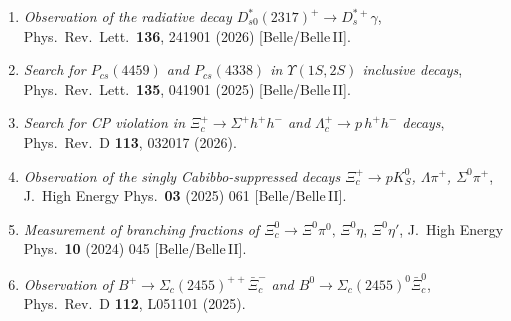 \documentclass[a4paper,11pt,fontset=none]{ctexart}
\begin{document}
{\smallskip
\noindent{}
\begin{enumerate}\setlength{\itemsep}{1.5pt}
  \item \textit{Observation of the radiative decay $D_{s0}^{*}(2317)^{+}\!\to D_{s}^{*+}\gamma$}, Phys.\ Rev.\ Lett.\ \textbf{136}, 241901 (2026) [Belle/Belle\,II].
  \item \textit{Search for $P_{cs}(4459)$ and $P_{cs}(4338)$ in $\Upsilon(1S,2S)$ inclusive decays}, Phys.\ Rev.\ Lett.\ \textbf{135}, 041901 (2025) [Belle/Belle\,II].
  \item \textit{Search for CP violation in $\Xi_{c}^{+}\!\to\Sigma^{+}h^{+}h^{-}$ and $\Lambda_{c}^{+}\!\to p\,h^{+}h^{-}$ decays}, Phys.\ Rev.\ D \textbf{113}, 032017 (2026)\;[Belle\,II].
  \item \textit{Observation of the singly Cabibbo-suppressed decays $\Xi_{c}^{+}\!\to pK_{S}^{0}$, $\Lambda\pi^{+}$, $\Sigma^{0}\pi^{+}$}, J.\ High Energy Phys.\ \textbf{03} (2025) 061 [Belle/Belle\,II].
  \item \textit{Measurement of branching fractions of $\Xi_{c}^{0}\!\to\Xi^{0}\pi^{0},\,\Xi^{0}\eta,\,\Xi^{0}\eta'$}, J.\ High Energy Phys.\ \textbf{10} (2024) 045 [Belle/Belle\,II].
  \item \textit{Observation of $B^{+}\!\to\Sigma_{c}(2455)^{++}\bar\Xi_{c}^{-}$ and $B^{0}\!\to\Sigma_{c}(2455)^{0}\bar\Xi_{c}^{0}$}, Phys.\ Rev.\ D \textbf{112}, L051101 (2025).
\end{enumerate}
}
\end{document}
